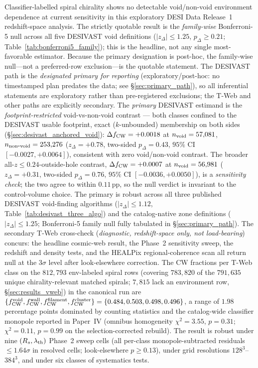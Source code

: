 \documentclass[aps,prd,twocolumn,superscriptaddress,showpacs,preprintnumbers,nofootinbib,longbibliography,floatfix]{revtex4-2}
\begin{document}
Classifier-labelled spiral chirality shows no detectable void/non-void
environment dependence at current sensitivity in this exploratory DESI
Data Release~1 redshift-space analysis.
The strictly quotable result is the \emph{family-wise} Bonferroni-5 null
across all five DESIVAST void definitions ($|z_\Delta|\!\le\!1.25$,
$p_\Delta\!\ge\!0.21$; Table~\ref{tab:bonferroni5_family}); this is the
headline, not any single most-favorable estimator.
Because the primary designation is post-hoc, the family-wise null---not
a preferred-row exclusion---is the quotable statement. The DESIVAST path is the
\emph{designated primary for reporting} (exploratory/post-hoc: no
timestamped plan predates the data; see \S\ref{sec:primary_path}), so
all inferential statements are exploratory rather than pre-registered exclusions;
the T-Web and other paths are explicitly secondary.
The \emph{primary} DESIVAST estimand is the
\emph{footprint-restricted} void-vs-non-void contrast --- both classes
confined to the DESIVAST usable footprint, exact ($k$-unbounded)
membership on both sides (\S\ref{sec:desivast_anchored_void}):
$\Delta f_{\rm CW} = +0.0018$ at $n_{\rm void} = 57{,}081$,
$n_{\rm non\mbox{-}void} = 253{,}276$
($z_\Delta = +0.78$, two-sided $p_\Delta = 0.43$, $95\%$ CI
$[-0.0027, +0.0064]$), consistent with zero void/non-void contrast. The broader
all-$z\!\le\!0.24$-outside-hole contrast, $\Delta f_{\rm CW} = +0.0007$
at $n_{\rm void} = 56{,}981$
($z_\Delta = +0.31$, two-sided $p_\Delta = 0.76$, $95\%$ CI
$[-0.0036, +0.0050]$), is a \emph{sensitivity check}; the two agree to
within $0.11$\,pp, so the null verdict is invariant to the control-volume
choice. The primary is robust across all three published DESIVAST
void-finding algorithms ($|z_\Delta| \leq 1.12$,
Table~\ref{tab:desivast_three_algo}) and the catalog-native zone
definitions ($|z_\Delta| \leq 1.25$; Bonferroni-5 family null
fully tabulated in \S\ref{sec:primary_path}). The secondary T-Web cross-check
(\emph{diagnostic, redshift-space only, not load-bearing}) concurs:
the headline cosmic-web result, the Phase~2 sensitivity sweep, the
redshift and density tests, and the HEALPix regional-coherence scan
all return null at the $3\sigma$ level after look-elsewhere correction.
The CW fractions per T-Web class on the $812{,}793$ env-labeled spiral
rows (covering $783{,}820$ of the $791{,}635$ unique chirality-relevant
matched spirals; $7{,}815$ lack an environment row,
\S\ref{sec:results_vweb}) in the canonical run are
$\{f_{\rm CW}^{\rm void}, f_{\rm CW}^{\rm wall},
f_{\rm CW}^{\rm filament}, f_{\rm CW}^{\rm cluster}\} =
\{0.484, 0.503, 0.498, 0.496\}$, a range of $1.98$\,percentage points
dominated by counting statistics and the catalog-wide classifier
monopole reported in Paper~IV (omnibus homogeneity
$\chi^2 = 3.55$, $p = 0.31$; $\chi^2 = 0.11$, $p = 0.99$ on the
selection-corrected rebuild). The result is robust under nine
$(R_s, \lambda_{\rm th})$ Phase~2 sweep cells (all per-class
monopole-subtracted residuals $\le 1.64\sigma$ in resolved cells; look-elsewhere
$p \ge 0.13$), under grid resolutions $128^3$--$384^3$, and under six
classes of systematics tests.
\end{document}
